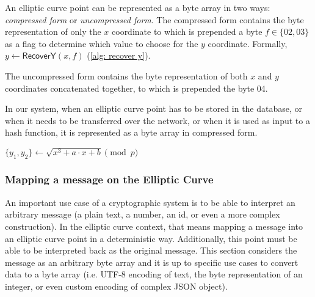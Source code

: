 An elliptic curve point can be represented as a byte array in two ways: \textit{compressed form} or \textit{uncompressed form}. The compressed form contains the byte representation of only the $x$ coordinate to which is prepended a byte $f \in \{ 02, 03 \}$ as a flag to determine which value to choose for the $y$ coordinate. Formally, $y \gets \mathsf{RecoverY}(x, f)$ (\cref{alg: recover y}).

The uncompressed form contains the byte representation of both $x$ and $y$ coordinates concatenated together, to which is prepended the byte 04.

In our system, when an elliptic curve point has to be stored in the database, or when it needs to be transferred over the network, or when it is used as input to a hash function, it is represented as a byte array in compressed form.

\begin{algorithm}[ht]
\DontPrintSemicolon
    \caption{$\mathsf{RecoverY} (x, f)$}
    \label{alg: recover y}

    $\{ y_1, y_2 \} \gets \sqrt{x^3 + a \cdot x + b} \pmod p$ \;
     
\end{algorithm}


\subsubsection{Mapping a message on the Elliptic Curve} \label{app: mapping a message on the elliptic curve}
An important use case of a cryptographic system is to be able to interpret an arbitrary message (a plain text, a number, an id, or even a more complex construction). In the elliptic curve context, that means mapping a message into an elliptic curve point in a deterministic way. Additionally, this point must be able to be interpreted back as the original message. This section considers the message as an arbitrary byte array and it is up to specific use cases to convert data to a byte array (i.e. UTF-8 encoding of text, the byte representation of an integer, or even custom encoding of complex JSON object).

